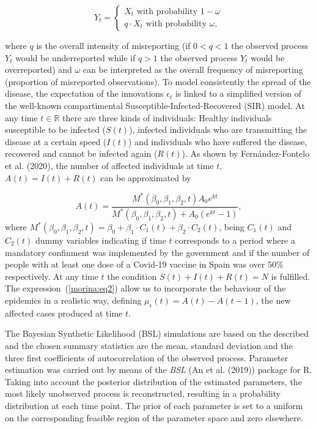 \documentclass[twoside]{report}
\begin{document}
\begin{equation}\label{morina:eq1}
    Y_t=\left\{
                \begin{array}{ll}
                  X_t \text{ with probability } 1-\omega \\
                  q \cdot X_t \text{ with probability } \omega,
                \end{array}
              \right.
\end{equation}

where $q$ is the overall intensity of misreporting (if $0 < q < 1$ the observed process $Y_t$ would be underreported while if $q > 1$ the observed process $Y_t$ would be overreported) and $\omega$ can be interpreted as the overall frequency of misreporting (proportion of misreported observations). To model consistently the spread of the disease, the expectation of the innovations $\epsilon_t$ is linked to a simplified version of the well-known compartimental Susceptible-Infected-Recovered (SIR) model. At any time $t \in \mathbb{R}$ there are three kinds of individuals: Healthy individuals susceptible to be infected ($S(t)$), infected individuals who are transmitting the disease at a certain speed ($I(t)$) and individuals who have suffered the disease, recovered and cannot be infected again ($R(t)$). As shown by Fern\'andez-Fontelo et al. (2020), the number of affected individuals at time $t$, $A(t) = I(t) + R(t)$ can be approximated by

\begin{equation}\label{morina:eq2}
 A(t) = \frac{M^{*}(\beta_0, \beta_1, \beta_2, t) A_0 e^{kt}}{M^{*}(\beta_0, \beta_1, \beta_2, t)+A_0(e^{kt}-1)},
\end{equation}
where $M^{*}(\beta_0, \beta_1, \beta_2, t) = \beta_0+\beta_1 \cdot C_1(t) + \beta_2 \cdot C_2(t)$, being $C_1(t)$ and $C_2(t)$ dummy variables indicating if time $t$ corresponds to a period where a mandatory confinment was implemented by the government and if the number of people with at least one dose of a Covid-19 vaccine in Spain was over 50\% respectively. At any time $t$ the condition $S(t) + I(t) + R(t) = N$ is fulfilled. The expression~(\ref{morina:eq2}) allow us to incorporate the behaviour of the epidemics in a realistic way, defining $\mu_{\epsilon}(t) = A(t) - A(t-1)$, the new affected cases produced at time $t$.

The Bayesian Synthetic Likelihood (BSL) simulations are based on the described and the chosen summary statistics are the mean, standard deviation and the three first coefficients of autocorrelation of the observed process. Parameter estimation was carried out by means of the \textit{BSL} (An et al. (2019)) package for R. Taking into account the posterior distribution of the estimated parameters, the most likely unobserved process is reconstructed, resulting in a probability distribution at each time point. The prior of each parameter is set to a uniform on the corresponding feasible region of the parameter space and zero elsewhere.
\end{document}
